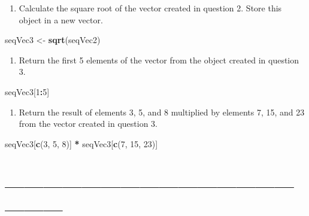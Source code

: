 \documentclass[]{article}
\newenvironment{Shaded}{\begin{snugshade}}{\end{snugshade}}
\newcommand{\KeywordTok}[1]{\textcolor[rgb]{0.13,0.29,0.53}{\textbf{#1}}}
\newcommand{\DecValTok}[1]{\textcolor[rgb]{0.00,0.00,0.81}{#1}}
\newcommand{\StringTok}[1]{\textcolor[rgb]{0.31,0.60,0.02}{#1}}
\newcommand{\OperatorTok}[1]{\textcolor[rgb]{0.81,0.36,0.00}{\textbf{#1}}}
\newcommand{\NormalTok}[1]{#1}
\providecommand{\tightlist}{%
  \setlength{\itemsep}{0pt}\setlength{\parskip}{0pt}}
\begin{document}
\begin{enumerate}
\def\labelenumi{\arabic{enumi}.}
\setcounter{enumi}{2}
\tightlist
\item
  Calculate the square root of the vector created in question 2. Store
  this object in a new vector.
\end{enumerate}

\begin{Shaded}
\begin{Highlighting}[]
\NormalTok{seqVec3 <-}\StringTok{ }\KeywordTok{sqrt}\NormalTok{(seqVec2)}
\end{Highlighting}
\end{Shaded}

\begin{enumerate}
\def\labelenumi{\arabic{enumi}.}
\setcounter{enumi}{3}
\tightlist
\item
  Return the first 5 elements of the vector from the object created in
  question 3.
\end{enumerate}

\begin{Shaded}
\begin{Highlighting}[]
\NormalTok{seqVec3[}\DecValTok{1}\OperatorTok{:}\DecValTok{5}\NormalTok{]}
\end{Highlighting}
\end{Shaded}

\begin{enumerate}
\def\labelenumi{\arabic{enumi}.}
\setcounter{enumi}{4}
\tightlist
\item
  Return the result of elements 3, 5, and 8 multiplied by elements 7,
  15, and 23 from the vector created in question 3.
\end{enumerate}

\begin{Shaded}
\begin{Highlighting}[]
\NormalTok{seqVec3[}\KeywordTok{c}\NormalTok{(}\DecValTok{3}\NormalTok{, }\DecValTok{5}\NormalTok{, }\DecValTok{8}\NormalTok{)] }\OperatorTok{*}\StringTok{ }\NormalTok{seqVec3[}\KeywordTok{c}\NormalTok{(}\DecValTok{7}\NormalTok{, }\DecValTok{15}\NormalTok{, }\DecValTok{23}\NormalTok{)]}
\end{Highlighting}
\end{Shaded}

\section{------------------------------------------------------}\label{section-2}
\end{document}
